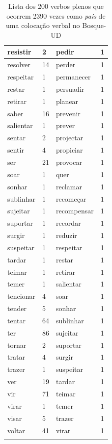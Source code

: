 \documentclass[output=paper,colorlinks,citecolor=brown]{langscibook}
\begin{document}
\begin{longtable}{ p{3cm} | p{1cm} | p{3cm} | p{1cm} }
		resistir & 2 & pedir & 1\\\hline
		resolver & 14 & perder & 1\\\hline
		respeitar & 1 & permanecer & 1\\\hline
		restar & 1 & persuadir & 1\\\hline
		retirar & 1 & planear & 1\\\hline
		saber & 16 & prevenir & 1\\\hline
		salientar & 1 & prever & 1\\\hline
		sentar & 2 & projectar & 1\\\hline
		sentir & 4 & propiciar & 1\\\hline
		ser & 21 & provocar & 1\\\hline
		soar & 1 & quer & 1\\\hline
		sonhar & 1 & reclamar & 1\\\hline
		sublinhar & 1 & recomeçar & 1\\\hline
		sujeitar & 1 & recompensar & 1\\\hline
		suportar & 1 & recordar & 1\\\hline
		surgir & 1 & reduzir & 1\\\hline
		suspeitar & 1 & respeitar & 1\\\hline
		tardar & 1 & restar & 1\\\hline
		teimar & 1 & retirar & 1\\\hline
		temer & 1 & salientar & 1\\\hline
		tencionar & 4 & soar & 1\\\hline
		tender & 5 & sonhar & 1\\\hline
		tentar & 64 & sublinhar & 1\\\hline
		ter & 86 & sujeitar & 1\\\hline
		tornar & 2 & suportar & 1\\\hline
		tratar & 4 & surgir & 1\\\hline
		trazer & 1 & suspeitar & 1\\\hline
		ver & 19 & tardar & 1\\\hline
		vir & 71 & teimar & 1\\\hline
		virar & 1 & temer & 1\\\hline
		visar & 5 & trazer & 1\\\hline
		voltar & 41 & virar & 1\\\hline
		\caption{Lista dos 200 verbos plenos que ocorrem 2390 vezes como \emph{pais} de uma colocação verbal no Bosque-UD}
		\label{tab:naolocverbal}
	\end{longtable}
\end{document}
